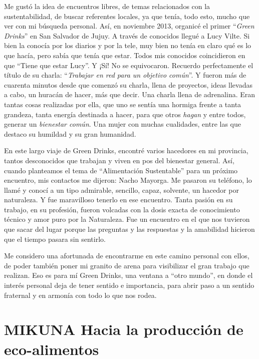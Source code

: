 \documentclass[
]{article}
\begin{document}
Me gustó la idea de encuentros libres, de temas relacionados con la
sustentabilidad, de buscar referentes locales, ya que tenía, todo esto,
mucho que ver con mi búsqueda personal. Así, en noviembre 2013, organicé
el primer ``\emph{Green Drinks}'' en San Salvador de Jujuy. A través de
conocidos llegué a Lucy Vilte. Si bien la conocía por los diarios y por
la tele, muy bien no tenía en claro qué es lo que hacía, pero sabía que
tenía que estar. Todos mis conocidos coincidieron en que ``Tiene que
estar Lucy''. Y ¡Sí! No se equivocaron. Recuerdo perfectamente el título
de su charla: ``\emph{Trabajar en red para un objetivo común}''. Y
fueron más de cuarenta minutos desde que comenzó su charla, llena de
proyectos, ideas llevadas a cabo, un huracán de hacer, más que decir.
Una charla llena de adrenalina. Eran tantas cosas realizadas por ella,
que uno se sentía una hormiga frente a tanta grandeza, tanta energía
destinada a hacer, para que otros \emph{hagan} y entre todos, generar un
\emph{bienestar común}. Una mujer con muchas cualidades, entre las que
destaco su humildad y su gran humanidad.

En este largo viaje de Green Drinks, encontré varios hacedores en mi
provincia, tantos desconocidos que trabajan y viven en pos del bienestar
general. Así, cuando planteamos el tema de ``Alimentación Sustentable''
para un próximo encuentro, mis contactos me dijeron: Nacho Mayorga. Me
pasaron su teléfono, lo llamé y conocí a un tipo admirable, sencillo,
capaz, solvente, un hacedor por naturaleza. Y fue maravilloso tenerlo en
ese encuentro. Tanta pasión en su trabajo, en su profesión, fueron
volcadas con la dosis exacta de conocimiento técnico y amor puro por la
Naturaleza. Fue un encuentro en el que nos tuvieron que sacar del lugar
porque las preguntas y las respuestas y la amabilidad hicieron que el
tiempo pasara sin sentirlo.

Me considero una afortunada de encontrarme en este camino personal con
ellos, de poder también poner mi granito de arena para visibilizar el
gran trabajo que realizan. Eso es para mí Green Drinks, una ventana a
``otro mundo'', en donde el interés personal deja de tener sentido e
importancia, para abrir paso a un sentido fraternal y en armonía con
todo lo que nos rodea.

\cleardoublepage

\hypertarget{mikuna-hacia-la-producciuxf3n-de-eco-alimentos}{%
\section{MIKUNA \textbar{} Hacia la producción de
eco-alimentos}\label{mikuna-hacia-la-producciuxf3n-de-eco-alimentos}}
\end{document}
